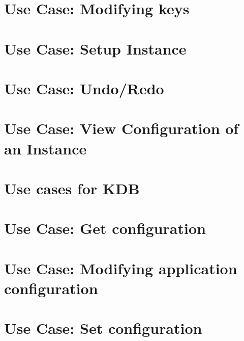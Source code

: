 \let\mypdfximage\pdfximage\def\pdfximage{\immediate\mypdfximage}\documentclass[twoside]{book}
\newcommand{\+}{\discretionary{\mbox{\scriptsize$\hookleftarrow$}}{}{}}
\begin{document}
\chapter{Use Case\+: Modifying keys}
\label{doc_usecases_elektra_web_UC_modifying_keys_md}

\chapter{Use Case\+: Setup Instance}
\label{doc_usecases_elektra_web_UC_setup_instance_md}

\chapter{Use Case\+: Undo/\+Redo}
\label{doc_usecases_elektra_web_UC_undo_redo_md}

\chapter{Use Case\+: View Configuration of an Instance}
\label{doc_usecases_elektra_web_UC_view_config_md}

\chapter{Use cases for KDB}
\label{doc_usecases_kdb_README_md}

\chapter{Use Case\+: Get configuration}
\label{doc_usecases_kdb_UC_get_config_md}

\chapter{Use Case\+: Modifying application configuration}
\label{doc_usecases_kdb_UC_modify_config_md}

\chapter{Use Case\+: Set configuration}
\label{doc_usecases_kdb_UC_set_config_md}

\end{document}
